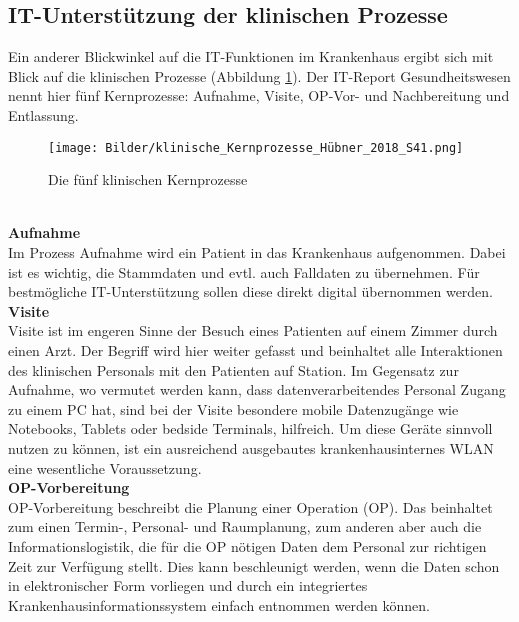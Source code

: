 \subsection{IT-Unterstützung der klinischen Prozesse}
\label{sec:klinischeProzesse}
	Ein anderer Blickwinkel auf die IT-Funktionen im Krankenhaus ergibt sich mit Blick auf die klinischen Prozesse (Abbildung \ref{fig:kernprozesse}). Der IT-Report Gesundheitswesen \parencite{huebner2019} nennt hier fünf Kernprozesse: Aufnahme, Visite, OP-Vor- und Nachbereitung und Entlassung.
 \begin{figure}[ht]
 	\centering
 	\texttt{[image: Bilder/klinische\_Kernprozesse\_Hübner\_2018\_S41.png]}		
 	\caption{Die fünf klinischen Kernprozesse \parencite[41]{huebner2018}}
 	\label{fig:kernprozesse}
 \end{figure}
	\vspace{\parheadvspace}\\
	\textbf{Aufnahme}\\
		Im Prozess Aufnahme wird ein Patient in das Krankenhaus aufgenommen. Dabei ist es wichtig, die Stammdaten und evtl. auch Falldaten zu übernehmen. Für bestmögliche IT-Unterstützung sollen diese direkt digital übernommen werden.
	\vspace{\parheadvspace}\\
	\textbf{Visite}\\
		Visite ist im engeren Sinne der Besuch eines Patienten auf einem Zimmer durch einen Arzt. Der Begriff wird hier weiter gefasst und beinhaltet alle Interaktionen des klinischen Personals mit den Patienten auf Station. Im Gegensatz zur Aufnahme, wo vermutet werden kann, dass datenverarbeitendes Personal Zugang zu einem PC hat, sind bei der Visite besondere mobile Datenzugänge wie Notebooks, Tablets oder bedside Terminals, hilfreich. Um diese Geräte sinnvoll nutzen zu können, ist ein ausreichend ausgebautes krankenhausinternes WLAN eine wesentliche Voraussetzung.
	\vspace{\parheadvspace}\\
	\textbf{OP-Vorbereitung}\\
		OP-Vorbereitung beschreibt die Planung einer Operation (OP). Das beinhaltet zum einen Termin-, Personal- und Raumplanung, zum anderen aber auch die Informationslogistik, die für die OP nötigen Daten dem Personal zur richtigen Zeit zur Verfügung stellt. Dies kann beschleunigt werden, wenn die Daten schon in elektronischer Form vorliegen und durch ein integriertes Krankenhausinformationssystem einfach entnommen werden können.
